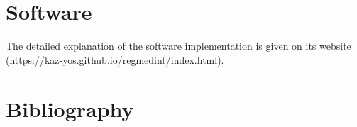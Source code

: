 \documentclass[dvipdfmx,10pt]{article}
\begin{document}
\section{Software}
\label{sec:org41ca1ed}
The detailed explanation of the software implementation is given on its website (\url{https://kaz-yos.github.io/regmedint/index.html}).

\section{Bibliography}
\label{sec:org3fcc9a7}
\renewcommand{\section}[2]{}



\end{document}
